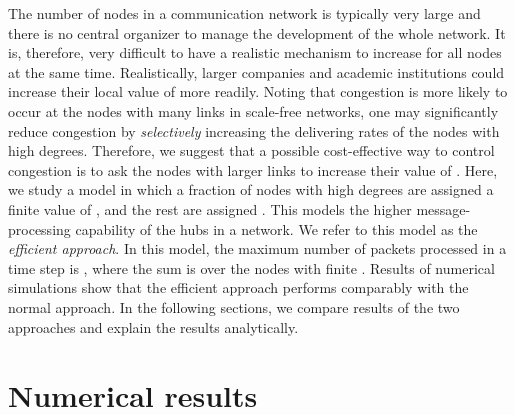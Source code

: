 \documentclass[aps,prl,twocolumn,superscriptaddress,showpacs]{revtex4}
\begin{document}
The number of nodes in a communication network is typically very
large and there is no central organizer to manage the development
of the whole network.  It is, therefore, very difficult to have a
realistic mechanism to increase  for all nodes at the same
time. Realistically, larger companies and academic institutions
could increase their local value of  more readily. Noting
that congestion is more likely to occur at the nodes with many
links in scale-free networks, one may significantly reduce
congestion by {\em selectively} increasing the delivering rates of
the nodes with high degrees.  Therefore, we suggest that a
possible cost-effective way to control congestion is to ask the
nodes with larger links to increase their value of . Here,
we study a model in which a fraction  of nodes with high
degrees are assigned a finite value of , and the rest
are assigned . This models the higher message-processing
capability of the hubs in a network.  We refer to this model as
the {\em efficient approach}. In this model, the maximum number of
packets processed in a time step is ,
where the sum is over the nodes with finite . Results of
numerical simulations show that the efficient approach performs
comparably with the normal approach. In the following sections, we
compare results of the two approaches and explain the results
analytically.

\section{Numerical results}
\end{document}
